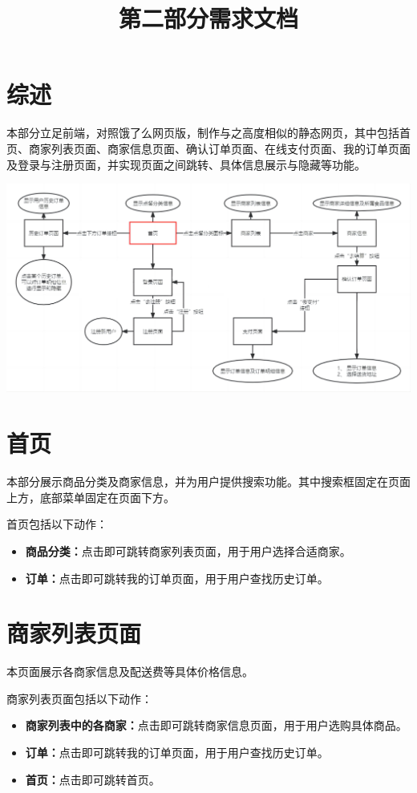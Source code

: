 \documentclass[UTF8]{ctexart}
\title{\vspace{-1.5cm}第二部分需求文档\vspace{-2em}}
\date{}
\begin{document}
\maketitle
\section{综述}
本部分立足前端，对照饿了么网页版，制作与之高度相似的静态网页，其中包括首页、商家列表页面、商家信息页面、确认订单页面、在线支付页面、我的订单页面及登录与注册页面，并实现页面之间跳转、具体信息展示与隐藏等功能。

\includegraphics[width=1\textwidth]{第二部分}

\section{首页}
本部分展示商品分类及商家信息，并为用户提供搜索功能。其中搜索框固定在页面上方，底部菜单固定在页面下方。

首页包括以下动作：
\begin{itemize}
    \item \textbf{商品分类：}点击即可跳转商家列表页面，用于用户选择合适商家。
    \item \textbf{订单：}点击即可跳转我的订单页面，用于用户查找历史订单。
\end{itemize}

\section{商家列表页面}
本页面展示各商家信息及配送费等具体价格信息。

商家列表页面包括以下动作：
\begin{itemize}
    \item \textbf{商家列表中的各商家：}点击即可跳转商家信息页面，用于用户选购具体商品。
    \item \textbf{订单：}点击即可跳转我的订单页面，用于用户查找历史订单。
    \item \textbf{首页：}点击即可跳转首页。
\end{itemize}
\end{document}

